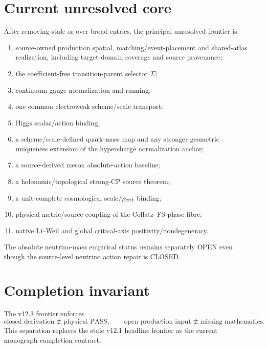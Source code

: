 \section{Current unresolved core}

After removing stale or over-broad entries, the principal unresolved frontier
is:
\begin{enumerate}
\item source-owned production spatial, matching/event-placement and shared-atlas
      realization, including target-domain coverage and source provenance;
\item the coefficient-free transition-parent selector \(\Sigma\);
\item continuum gauge normalization and running;
\item one common electroweak scheme/scale transport;
\item Higgs scalar/action binding;
\item a scheme/scale-defined quark-mass map and any stronger geometric
      uniqueness extension of the hypercharge normalization anchor;
\item a source-derived meson absolute-action baseline;
\item a holonomic/topological strong-CP source theorem;
\item a unit-complete cosmological scale/\(\rho_{\rm crit}\) binding;
\item physical metric/source coupling of the Collatz--FS phase fibre;
\item native Li--Weil and global critical-axis positivity/nondegeneracy.
\end{enumerate}

The absolute neutrino-mass empirical status remains separately OPEN even though
the source-level neutrino action repair is CLOSED.

\section{Completion invariant}

The v12.3 frontier enforces
\[
\boxed{
\text{closed derivation}\not\equiv\text{physical PASS},
\qquad
\text{open production input}\not\equiv\text{missing mathematics}.
}
\]
This separation replaces the stale v12.1 headline frontier as the current
monograph completion contract.

\clearpage
